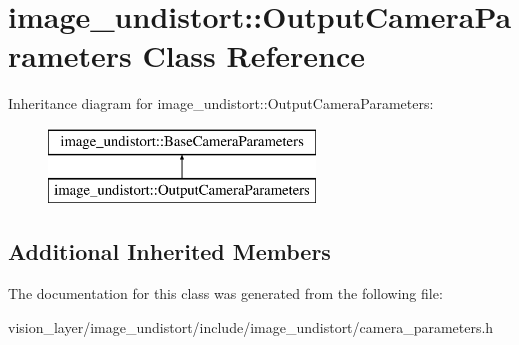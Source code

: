 \hypertarget{classimage__undistort_1_1OutputCameraParameters}{}\section{image\+\_\+undistort\+:\+:Output\+Camera\+Parameters Class Reference}
\label{classimage__undistort_1_1OutputCameraParameters}
Inheritance diagram for image\+\_\+undistort\+:\+:Output\+Camera\+Parameters\+:\begin{figure}[H]
\begin{center}
\leavevmode
\includegraphics[height=2.000000cm]{classimage__undistort_1_1OutputCameraParameters}
\end{center}
\end{figure}
\subsection*{Additional Inherited Members}


The documentation for this class was generated from the following file\+:\begin{DoxyCompactItemize}
\item 
vision\+\_\+layer/image\+\_\+undistort/include/image\+\_\+undistort/camera\+\_\+parameters.\+h\end{DoxyCompactItemize}

